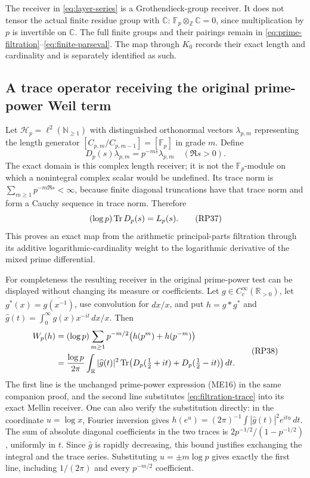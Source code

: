 The receiver in \eqref{eq:layer-series} is a Grothendieck-group receiver.
It does not tensor the actual finite residue group with $\mathbb C$:
$\mathbb F_p\otimes_{\mathbb Z}\mathbb C=0$, since multiplication by
$p$ is invertible on $\mathbb C$. The full finite groups and their
pairings remain in \eqref{eq:prime-filtration}--\eqref{eq:finite-parseval}.
The map through $K_0$ records their exact length and cardinality and
is separately identified as such.

\subsection{A trace operator receiving the original prime-power Weil term}

Let $\mathcal H_p=\ell^2(\mathbb N_{\ge1})$ with distinguished
orthonormal vectors $\lambda_{p,m}$ representing the length generator
$[C_{p,m}/C_{p,m-1}]=[\mathbb F_p]$ in grade $m$. Define
\[
 D_p(s)\lambda_{p,m}=p^{-ms}\lambda_{p,m}\quad(\Re s>0).
 \tag{RP36}\label{eq:filtration-trace-operator}
\]
The exact domain is this complex length receiver; it is not the
$\mathbb F_p$-module on which a nonintegral complex scalar would be
undefined. Its trace norm is
$\sum_{m\ge1}p^{-m\Re s}<\infty$, because finite diagonal truncations
have that trace norm and form a Cauchy sequence in trace norm. Therefore
\[
 (\log p)\operatorname{Tr} D_p(s)=L_p(s).
 \tag{RP37}\label{eq:filtration-trace}
\]
This proves an exact map from the arithmetic principal-parts filtration
through its additive logarithmic-cardinality weight to the logarithmic
derivative of the mixed prime differential.

For completeness the resulting receiver in the original prime-power
test can be displayed without changing its measure or coefficients.
Let $g\in C_c^\infty(\mathbb R_{>0})$, let
$g^*(x)=\overline{g(x^{-1})}$, use convolution for $dx/x$, and put
$h=g*g^*$ and
$\widehat g(t)=\int_0^\infty g(x)x^{-it}\,dx/x$. Then
\[
\begin{split}
 W_p(h)
 &=(\log p)\sum_{m\ge1}p^{-m/2}\bigl(h(p^m)+h(p^{-m})\bigr)\\
 &=\frac{\log p}{2\pi}\int_{\mathbb R}|\widehat g(t)|^2
 \operatorname{Tr}\bigl(D_p(\tfrac12+it)+D_p(\tfrac12-it)\bigr)\,dt.
\end{split}
 \tag{RP38}\label{eq:filtration-Weil-term}
\]
The first line is the unchanged prime-power expression (ME16) in the
same companion proof, and the second line substitutes
\eqref{eq:filtration-trace} into its exact Mellin receiver. One can
also verify the substitution directly: in the coordinate $u=\log x$,
Fourier inversion gives
$h(e^u)=(2\pi)^{-1}\int|\widehat g(t)|^2e^{itu}\,dt$.
The sum of absolute diagonal coefficients in the two traces is
$2p^{-1/2}/(1-p^{-1/2})$, uniformly in $t$. Since $\widehat g$ is
rapidly decreasing, this bound justifies exchanging the integral and
the trace series. Substituting $u=\pm m\log p$ gives exactly the first
line, including $1/(2\pi)$ and every $p^{-m/2}$ coefficient.


